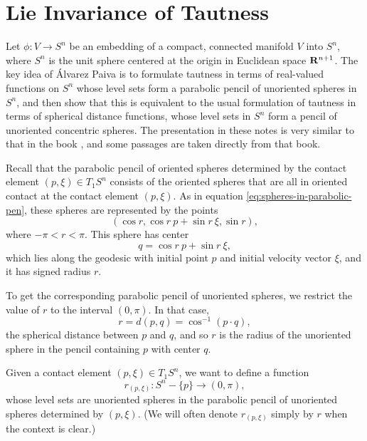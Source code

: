 \documentclass[12pt]{article}
\begin{document}
\section{Lie Invariance  of Tautness}
\label{sec:4}

Let $\phi:V \rightarrow S^n$ be an embedding of a compact, connected manifold $V$ into $S^n$, where 
$S^n$ is the unit sphere centered at the origin in Euclidean space ${\bf R}^{n+1}$.
The key idea of \'{A}lvarez Paiva \cite{Alv} 
is to formulate tautness in terms of real-valued
functions on $S^n$ whose level sets form a parabolic pencil 
of unoriented spheres in $S^n$, and then show that this is equivalent to the usual formulation 
of tautness in terms of spherical distance functions,
whose level sets in $S^n$ form a pencil of unoriented concentric spheres.  
The presentation in these notes is very similar to that in the book \cite[pp. 82--95]{Cec1}, 
and some passages are taken directly from that book.

Recall that the parabolic pencil of oriented spheres determined by the contact element $(p,\xi) \in T_1S^n$ consists of the 
oriented spheres that are all in oriented contact at the contact element $(p,\xi)$.  
As in equation \eqref{eq:spheres-in-parabolic-pen}, these spheres are represented by the points
\begin{equation}
\label{eq:parabolic-pencil}
(\cos r , \cos r\  p + \sin r\  \xi, \sin r),
\end{equation}
where $ - \pi < r < \pi$.  
This sphere has center
\begin{equation}
\label{eq:3.6.4}
q = \cos r\  p + \sin r\  \xi,
\end{equation}
which lies along the geodesic with initial point $p$ and initial velocity vector $\xi$, and it has signed radius $r$. 

To get the corresponding parabolic pencil of unoriented spheres, we restrict the value of $r$
to the interval $(0,\pi)$.  In that case,
\begin{displaymath}
r = d(p,q) = \cos^{-1} (p \cdot q),
\end{displaymath}
the spherical distance between $p$ and $q$, and so $r$ is the radius of the unoriented sphere in the pencil containing $p$ with center $q$.
 

Given a contact element $(p,\xi) \in T_1S^n$, we want to define a function
\begin{displaymath}
r_{(p,\xi)}: S^n - \{ p\} \rightarrow (0, \pi),
\end{displaymath}
whose level sets are unoriented spheres in the parabolic pencil
of unoriented spheres determined by $(p,\xi)$.
(We will often denote $r_{(p,\xi)}$ simply by $r$ when the context is clear.)  
\end{document}
